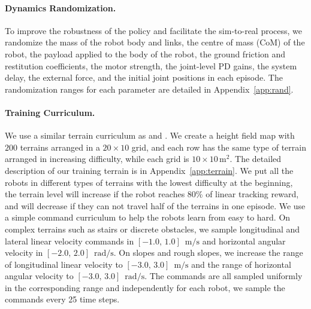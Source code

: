 \paragraph{Dynamics Randomization.}
To improve the robustness of the policy and facilitate the sim-to-real process, we randomize the mass of the robot body and links, the centre of mass (CoM) of the robot, the payload applied to the body of the robot, the ground friction and restitution coefficients, the motor strength, the joint-level PD gains, the system delay, the external force, and the initial joint positions in each episode. The randomization ranges for each parameter are detailed in Appendix~\ref{app:rand}.

\paragraph{Training Curriculum.}
\label{curriculum}
We use a similar terrain curriculum as \cite{rudin2022learning} and \cite{wu2023learning}. We create a height field map with $200$ terrains arranged in a $20 \times 10$ grid, and each row has the same type of terrain arranged in increasing difficulty, while each grid is $10 \times 10 \, \text{m}^2$. The detailed description of our training terrain is in Appendix~\ref{app:terrain}.  We put all the robots in different types of terrains with the lowest difficulty at the beginning, the terrain level will increase if the robot reaches 80\% of linear tracking reward, and will decrease if they can not travel half of the terrains in one episode.
We use a simple command curriculum to help the robots learn from easy to hard. On complex terrains such as stairs or discrete obstacles, we sample longitudinal and lateral linear velocity commands in $[-1.0,\, 1.0 ] \,\text{ m/s}$ and horizontal angular velocity in $[-2.0,\, 2.0 ]\,\text{ rad/s}$. On slopes and rough slopes, we increase the range of longitudinal linear velocity to $[-3.0,\, 3.0]\,\text{ m/s}$ and the range of horizontal angular velocity to $[-3.0,\, 3.0]\,\text{ rad/s}$. The commands are all sampled uniformly in the corresponding range and independently for each robot, we sample the commands every 25 time steps.
